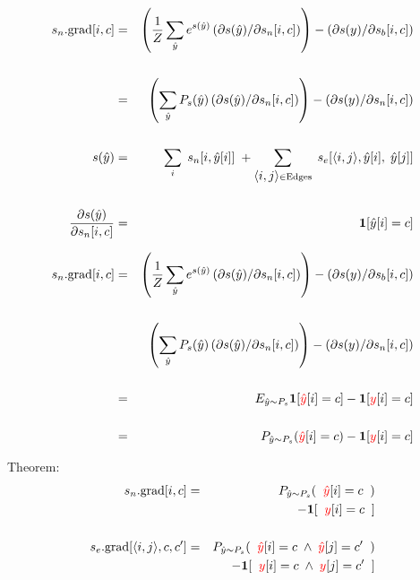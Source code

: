 {

\begin{eqnarray*}
    s_n.\mathrm{grad}[i,c] & = & \left(\frac{1}{Z} \sum_{\hat{y}} e^{s(\hat{y})} \left(\partial s(\hat{y})/\partial s_n[i,c]\right)\right)
    - \left(\partial s(y) /\partial s_b[i,c]\right)  \\
    \\
    & = & \left(\sum_{\hat{y}} P_s(\hat{y}) \left(\partial s(\hat{y})/\partial s_n[i,c]\right)\right)
    - \left(\partial s(y) /\partial s_n[i,c]\right)    \\
    \\
    s(\hat{y}) & = & \sum_i\;s_n[i,\hat{y}[i]]\; + \sum_{{\mbox{$\langle i,j\rangle$}} \in \mathrm{Edges}}\;s_e[{\mbox{$\langle i,j\rangle$}},\hat{y}[i],\;\hat{y}[j]] \\
    \\
    \frac{\partial s(\hat{y})}{\partial s_n[i,c]} & = & \mathbf{1}[\hat{y}[i] = c]
\end{eqnarray*}


\begin{eqnarray*}
    s_n.\mathrm{grad}[i,c] & = & \left(\frac{1}{Z} \sum_{\hat{y}} e^{s(\hat{y})} \left(\partial s(\hat{y})/\partial s_n[i,c]\right)\right)
    - \left(\partial s(y) /\partial s_b[i,c]\right)  \\
    \\
    & & \left(\sum_{\hat{y}} P_s(\hat{y}) \left(\partial s(\hat{y})/\partial s_n[i,c]\right)\right)
    - \left(\partial s(y) /\partial s_n[i,c]\right)    \\
    \\
    & = & E_{\hat{y} \sim P_s}\mathbf{1}[{\color{red} \hat{y}}[i] = c]
    - \mathbf{1}[{\color{red}y}[i] = c] \\
    \\
    & = & P_{\hat{y} \sim P_s}({\color{red} \hat{y}}[i] = c)
      - \mathbf{1}[{\color{red}y}[i] = c]
\end{eqnarray*}


Theorem:
\begin{eqnarray*}
    s_n.\mathrm{grad}[i,c] & = &   P_{\hat{y} \sim P_s}(\;\;{\color{red} \hat{y}}[i] = c\;\;) \\
    & & \;\;\;\;\;- \mathbf{1}[\;\;{\color{red} y}[i] = c\;\;] \\
    \\
    s_e.\mathrm{grad}[{\mbox{$\langle i,j\rangle$}},c,c'] & = &  P_{\hat{y} \sim P_s}(\;\;{\color{red} \hat{y}}[i] = c \; \wedge \; {\color{red} \hat{y}}[j] = c'\;\;) \\
    & & \;\;\;\;\;- \mathbf{1}[\;\;{\color{red} y}[i] = c\; \wedge \; {\color{red} y}[j] =
    c'\;\;]
\end{eqnarray*}


}


